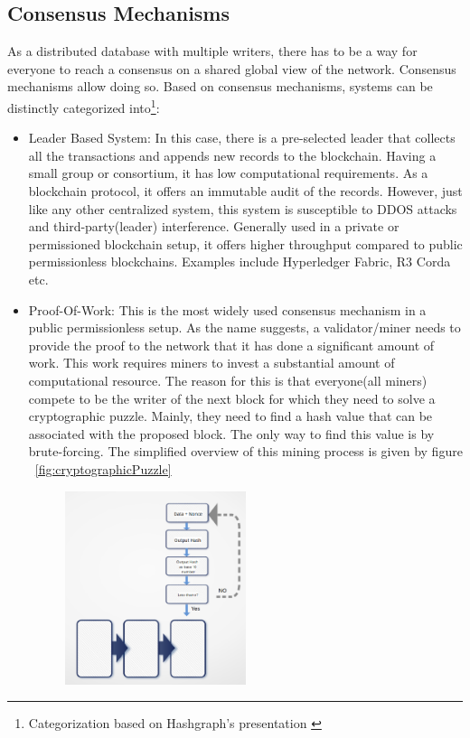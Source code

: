 \subsection{Consensus Mechanisms}
As a distributed database with multiple writers, there has to be a way for
everyone to reach a consensus on a shared global view of the network. Consensus
mechanisms allow doing so. Based on consensus mechanisms, systems can be
distinctly categorized into\footnote{Categorization based on Hashgraph's presentation \cite{baird2016hashgraph}}:
\begin{itemize}
	\item Leader Based System: In this case, there is a pre-selected leader
		that collects all the transactions and appends new records to the
		blockchain. Having a small group or consortium, it has low
		computational requirements. As a blockchain protocol, it offers an
		immutable audit of the records. However, just like any other
		centralized system, this system is susceptible to DDOS attacks and
		third-party(leader) interference. Generally used in a private or
		permissioned blockchain setup, it offers higher throughput compared to
		public permissionless blockchains. Examples include Hyperledger Fabric,
		R3 Corda etc. 
	\item Proof-Of-Work: This is the most widely used consensus mechanism in a
		public permissionless setup. As the name suggests, a validator/miner
		needs to provide the proof to the network that it has done a
		significant amount of work. This work requires miners to invest a
		substantial amount of computational resource. The reason for this is
		that everyone(all miners) compete to be the writer of the next block
		for which they need to solve a cryptographic puzzle. Mainly, they need
		to find a hash value that can be associated with the proposed block.
		The only way to find this value is by brute-forcing.  The simplified
		overview of this mining process is given by figure
		~\ref{fig:cryptographicPuzzle} 
		\begin{figure}
			\begin{center}
			\includegraphics[width=0.5\textwidth]{Images/CryptographicPuzzle.eps}

\end{center}
\end{figure}
\end{itemize}
